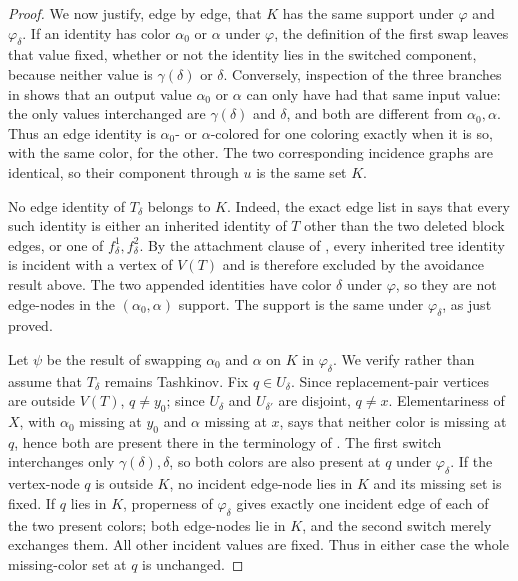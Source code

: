 \begin{proof}
We now justify, edge by edge, that $K$ has the same support under
$\varphi$ and $\varphi_\delta$.  If an identity has color
$\alpha_0$ or $\alpha$ under $\varphi$, the definition of the first swap
leaves that value fixed, whether or not the identity lies in the switched
component, because neither value is $\gamma(\delta)$ or $\delta$.
Conversely, inspection of the three branches in
 shows that an output value
$\alpha_0$ or $\alpha$ can only have had that same input value: the only
values interchanged are $\gamma(\delta)$ and $\delta$, and both are
different from $\alpha_0,\alpha$.  Thus an edge identity is
$\alpha_0$- or $\alpha$-colored for one coloring exactly when it is so,
with the same color, for the other.  The two corresponding incidence
graphs are identical, so their component through $u$ is the same set $K$.

No edge identity of $T_\delta$ belongs to $K$.  Indeed, the exact edge
list in  says that every such identity is
either an inherited identity of $T$ other than the two deleted block
edges, or one of $f^1_\delta,f^2_\delta$.  By the attachment clause of
, every inherited tree identity is incident with a
vertex of $V(T)$ and is therefore excluded by the avoidance result above.
The two appended identities have color $\delta$ under $\varphi$, so they
are not edge-nodes in the $(\alpha_0,\alpha)$ support.  The support is the
same under $\varphi_\delta$, as just proved.

Let $\psi$ be the result of swapping $\alpha_0$ and $\alpha$ on $K$ in
$\varphi_\delta$.  We verify rather than assume that $T_\delta$ remains
Tashkinov.  Fix $q\in U_\delta$.  Since replacement-pair vertices are
outside $V(T)$, $q\ne y_0$; since $U_\delta$ and $U_{\delta'}$ are
disjoint, $q\ne x$.  Elementariness of $X$, with $\alpha_0$ missing at
$y_0$ and $\alpha$ missing at $x$, says that neither color is missing at
$q$, hence both are present there in the terminology of
.  The first switch interchanges only
$\gamma(\delta),\delta$, so both colors are also present at $q$ under
$\varphi_\delta$.  If the vertex-node $q$ is outside $K$, no incident
edge-node lies in $K$ and its missing set is fixed.  If $q$ lies in $K$,
properness of $\varphi_\delta$ gives exactly one incident edge of each of
the two present colors; both edge-nodes lie in $K$, and the second switch
merely exchanges them.  All other incident values are fixed.  Thus in
either case the whole missing-color set at $q$ is unchanged.


\end{proof}
